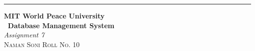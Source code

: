 \documentclass{article}
\begin{document}
	\begin{titlepage} %
		
		\raggedleft\rule{1pt}{\textheight} %
		\hspace{0.05\textwidth} %
		\parbox[b]{0.75\textwidth}
		{ %
			
			{\Huge\bfseries MIT World Peace University \\[0.5\baselineskip] \ Database Management System}\\[2\baselineskip] %
			{\large\textit{Assignment 7}}\\[4\baselineskip] %
			{\Large\textsc{Naman Soni Roll No. 10}} %
			
			\vspace{0.5\textheight} %
		}
		
\end{titlepage}
\end{document}
